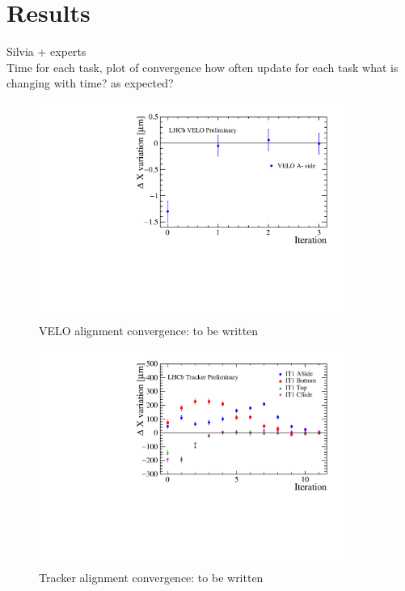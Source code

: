 \section{Results}
\label{sec:results}
Silvia + experts\\

Time for each task, plot of convergence
how often update for each task
what is changing with time? as expected?


\begin{figure}[h]
  \centering
  \includegraphics[width=10cm]{../figures/VeloConvergence}
  \caption{VELO alignment convergence: to be written
}
  \label{fig:VeloConvergence}
\end{figure}

\begin{figure}[h]
  \centering
  \includegraphics[width=10cm]{../figures/TrackerConvergence}
  \caption{Tracker alignment convergence: to be written
}
  \label{fig:TrackerConvergence}
\end{figure}

